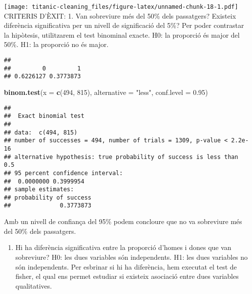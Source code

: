 \documentclass[]{article}
\newenvironment{Shaded}{\begin{snugshade}}{\end{snugshade}}
\newcommand{\DataTypeTok}[1]{\textcolor[rgb]{0.13,0.29,0.53}{#1}}
\newcommand{\DecValTok}[1]{\textcolor[rgb]{0.00,0.00,0.81}{#1}}
\newcommand{\FloatTok}[1]{\textcolor[rgb]{0.00,0.00,0.81}{#1}}
\newcommand{\KeywordTok}[1]{\textcolor[rgb]{0.13,0.29,0.53}{\textbf{#1}}}
\newcommand{\NormalTok}[1]{#1}
\newcommand{\OperatorTok}[1]{\textcolor[rgb]{0.81,0.36,0.00}{\textbf{#1}}}
\newcommand{\StringTok}[1]{\textcolor[rgb]{0.31,0.60,0.02}{#1}}
\providecommand{\tightlist}{%
  \setlength{\itemsep}{0pt}\setlength{\parskip}{0pt}}
\begin{document}
\texttt{[image: titanic-cleaning\_files/figure-latex/unnamed-chunk-18-1.pdf]}
CRITERIS D'ÈXIT: 1. Van sobreviure més del 50\% dels passatgers?
Existeix diferència significativa per un nivell de significació del 5\%?
Per poder contrastar la hipòtesis, utilitzarem el test binominal exacte.
H0: la proporció és major del 50\%. H1: la proporció no és major.

\begin{Shaded}
\end{Shaded}

\begin{verbatim}
## 
##         0         1 
## 0.6226127 0.3773873
\end{verbatim}

\begin{Shaded}
\begin{Highlighting}[]
\KeywordTok{binom.test}\NormalTok{(}\DataTypeTok{x =} \KeywordTok{c}\NormalTok{(}\DecValTok{494}\NormalTok{, }\DecValTok{815}\NormalTok{), }\DataTypeTok{alternative =} \StringTok{"less"}\NormalTok{, }\DataTypeTok{conf.level =} \FloatTok{0.95}\NormalTok{)}
\end{Highlighting}
\end{Shaded}

\begin{verbatim}
## 
##  Exact binomial test
## 
## data:  c(494, 815)
## number of successes = 494, number of trials = 1309, p-value < 2.2e-16
## alternative hypothesis: true probability of success is less than 0.5
## 95 percent confidence interval:
##  0.0000000 0.3999954
## sample estimates:
## probability of success 
##              0.3773873
\end{verbatim}

Amb un nivell de confiança del 95\% podem concloure que no va sobreviure
més del 50\% dels passatgers.

\begin{enumerate}
\def\labelenumi{\arabic{enumi}.}
\setcounter{enumi}{1}
\tightlist
\item
  Hi ha diferència significativa entre la proporció d'homes i dones que
  van sobreviure? H0: les dues variables són independents. H1: les dues
  variables no són independents. Per esbrinar si hi ha diferència, hem
  executat el test de fisher, el qual ens permet estudiar si existeix
  asociació entre dues variables qualitatives.
\end{enumerate}
\end{document}
